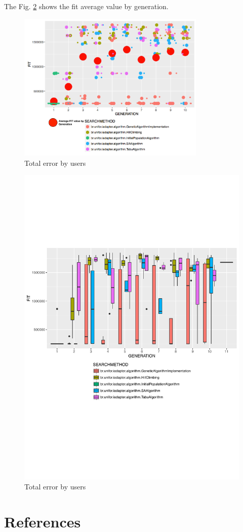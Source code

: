 \documentclass[review]{elsarticle}
\begin{document}
The Fig. \ref{fig:fitvaluebygenerationexperiment1} shows the fit average value by generation.

\begin{figure}[H]
\centering
\includegraphics[width=0.8\textwidth]{./images/experiment1fitvaluebygeneration.png}
\caption{Total error by users}
\label{fig:fitvaluebygenerationexperiment1}
\end{figure}


\begin{figure}[H]
\centering
\includegraphics[width=1\textwidth]{./images/experiment1algorithms.pdf}
\caption{Total error by users}
\label{fig:fitvaluebygenerationexperiment1}
\end{figure}

\section*{References}


\end{document}
